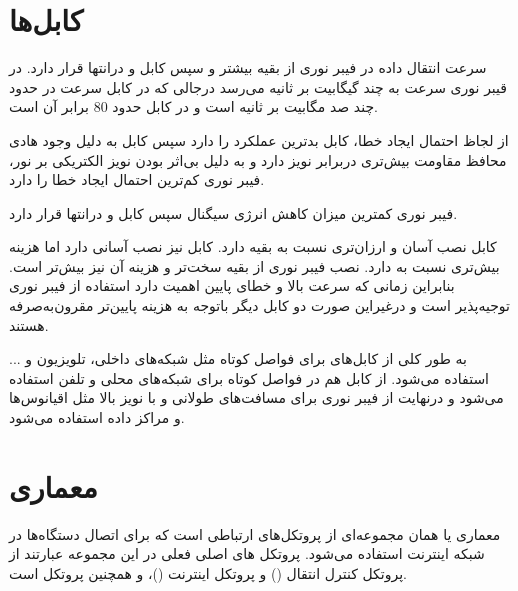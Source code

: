 \documentclass{article}
\begin{document}
\section{کابل‌ها}

سرعت انتقال داده در فیبر نوری از بقیه بیشتر و سپس کابل  و درانتها  قرار دارد. در قیبر نوری سرعت به چند گیگابیت بر ثانیه می‌رسد درجالی که در کابل  سرعت در حدود چند صد مگابیت بر ثانیه است و در کابل  حدود 80 برابر آن است.

از لجاظ احتمال ایجاد خطا، کابل  بدترین عملکرد را دارد سپس کابل  به دلیل وجود هادی محافظ مقاومت بیش‌تری دربرابر نویز دارد و به دلیل بی‌اثر بودن نویز الکتریکی بر نور، فیبر نوری کم‌ترین احتمال ایجاد خطا را دارد.

فیبر نوری کمترین میزان کاهش انرژی سیگنال سپس کابل  و درانتها  قرار دارد.

کابل  نصب آسان و ارزان‌تری نسبت به بقیه دارد. کابل  نیز نصب آسانی دارد اما هزینه بیش‌تری نسبت به  دارد. نصب فیبر نوری از بقیه سخت‌تر و هزینه آن نیز بیش‌تر است. بنابراین زمانی که سرعت بالا و خطای پایین اهمیت دارد استفاده از فیبر نوری توجیه‌پذیر است و درغیراین صورت دو کابل دیگر باتوجه به هزینه پایین‌تر مقرون‌به‌صرفه هستند.

به طور کلی از کابل‌های  برای فواصل کوتاه مثل شبکه‌های داخلی، تلویزیون و ... استفاده می‌شود. از کابل  هم در فواصل کوتاه برای شبکه‌های محلی و تلفن استفاده می‌شود و درنهایت از فیبر نوری برای مسافت‌های طولانی و با نویز بالا مثل اقیانوس‌ها و مراکز داده استفاده می‌شود.


\section{معماری }
معماری  یا همان  مجموعه‌ای از پروتکل‌های ارتباطی است که برای اتصال دستگاه‌ها در شبکه اینترنت استفاده می‌شود.
پروتکل های اصلی فعلی در این مجموعه عبارتند از پروتکل کنترل انتقال () و پروتکل اینترنت ()، و همچنین پروتکل  است.
\end{document}
